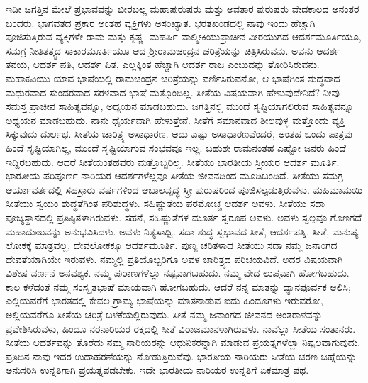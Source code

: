 ಇಡೀ ಜಗತ್ತಿನ ಮೇಲೆ ಪ್ರಭಾವವನ್ನು ಬೀರಬಲ್ಲ ಮಹಾಪುರುಷರು ಮತ್ತು ಅವತಾರ ಪುರುಷರು ವೇದಕಾಲದ ಅನಂತರ ಬಂದರು. ಭಾಗವತದ ಪ್ರಕಾರ ಅಂತಹ ವ್ಯಕ್ತಿಗಳು ಅಸಂಖ್ಯಾತ. ಭರತಖಂಡದಲ್ಲಿ ನಾವು ಇಂದು ಹೆಚ್ಚಾಗಿ ಪೂಜಿಸುತ್ತಿರುವ ವ್ಯಕ್ತಿಗಳೇ ರಾಮ ಮತ್ತು ಕೃಷ್ಣ. ಮಹರ್ಷಿ ವಾಲ್ಮೀಕಿಯುಪ್ರಾಚೀನ ವೀರಯುಗದ ಆದರ್ಶಮೂರ್ತಿಯೂ, ಸಮಗ್ರ ನೀತಿತತ್ತ್ವದ ಸಾಕಾರಮೂರ್ತಿಯೂ ಆದ ಶ‍್ರೀರಾಮಚಂದ್ರನ ಚರಿತ್ರೆಯನ್ನು ಚಿತ್ರಿಸಿರುವನು. ಅವನು ಆದರ್ಶ ತನಯ, ಆದರ್ಶ ಪತಿ, ಆದರ್ಶ ಪಿತ, ಎಲ್ಲಕ್ಕಿಂತ ಹೆಚ್ಚಾಗಿ ಆದರ್ಶ ರಾಜ ಎಂಬುದನ್ನು ತೋರಿಸಿರುವನು. ಮಹಾಕವಿಯು ಯಾವ ಭಾಷೆಯಲ್ಲಿ ರಾಮಚಂದ್ರನ ಚರಿತ್ರೆಯನ್ನು ವರ್ಣಿಸಿರುವನೋ, ಆ ಭಾಷೆಗಿಂತ ಶುದ್ಧವಾದ ಮಧುರವಾದ ಸುಂದರವಾದ ಸರಳವಾದ ಭಾಷೆ ಮತ್ತೊಂದಿಲ್ಲ. ಸೀತೆಯ ವಿಷಯವಾಗಿ ಹೇಳುವುದೇನಿದೆ? ನೀವು ಸಮಸ್ತ ಪ್ರಾಚೀನ ಸಾಹಿತ್ಯವನ್ನೂ, ಅಧ್ಯಯನ ಮಾಡಬಹುದು. ಜಗತ್ತಿನಲ್ಲಿ ಮುಂದೆ ಸೃಷ್ಟಿಯಾಗಲಿರುವ ಸಾಹಿತ್ಯವನ್ನೂ ಅಧ್ಯಯನ ಮಾಡಬಹುದು. ನಾನು ಧೈರ್ಯವಾಗಿ ಹೇಳುತ್ತೇನೆ. ಸೀತೆಗೆ ಸಮಾನವಾದ ಶೀಲವುಳ್ಳ ಮತ್ತೊಂದು ವ್ಯಕ್ತಿ ಸಿಕ್ಕುವುದು ದುರ್ಲಭ. ಸೀತೆಯ ಚಾರಿತ್ರ್ಯ ಅಸಾಧಾರಣ. ಅದು ಎಷ್ಟು ಅಸಾಧಾರಣವೆಂದರೆ, ಅಂತಹ ಒಂದು ಪಾತ್ರವು ಹಿಂದೆ ಸೃಷ್ಟಿಯಾಗಿಲ್ಲ, ಮುಂದೆ ಸೃಷ್ಟಿಯಾಗುವ ಸಂಭವವೂ ಇಲ್ಲ. ಬಹುಶಃ ರಾಮನಂತಹ ಎಷ್ಟೋ ಜನರು ಹಿಂದೆ ಇದ್ದಿರಬಹುದು. ಆದರೆ ಸೀತೆಯಂತಹವರು ಮತ್ತೊಬ್ಬರಿಲ್ಲ. ಸೀತೆಯು ಭಾರತೀಯ ಸ್ತ್ರೀಯರ ಆದರ್ಶ ಮೂರ್ತಿ. ಭಾರತೀಯ ಪರಿಪೂರ್ಣ ನಾರಿಯರ ಆದರ್ಶಗಳೆಲ್ಲವೂ ಸೀತೆಯ ಜೀವನದಿಂದ ಮೂಡಿಬಂದಿದೆ. ಸೀತೆಯು ಸಮಗ್ರ ಆರ್ಯಾವರ್ತದಲ್ಲಿ ಸಹಸ್ರಾರು ವರ್ಷಗಳಿಂದ ಆಬಾಲವೃದ್ಧ ಸ್ತ್ರೀ ಪುರುಷರಿಂದ ಪೂಜಿಸಲ್ಪಡುತ್ತಿರುವಳು. ಮಹಿಮಾಮಯಿ ಸೀತೆಯು ಸ್ವಯಂ ಶುದ್ಧತೆಗಿಂತ ಪರಿಶುದ್ಧಳು. ಸಹಿಷ್ಣುತೆಯ ಪರಮೋಚ್ಚ ಆದರ್ಶ ಅವಳು. ಸೀತೆಯು ಸದಾ ಪೂಜ್ಯಸ್ಥಾನದಲ್ಲಿ ಪ್ರತಿಷ್ಠಿತಳಾಗಿರುವಳು. ಸಹನೆ, ಸಹಿಷ್ಣುತೆಗಳ ಮೂರ್ತ ಸ್ವರೂಪ ಅವಳು. ಅವಳು ಸ್ವಲ್ಪವೂ ಗೊಣಗದೆ ಮಹಾದುಃಖವನ್ನು ಅನುಭವಿಸಿದಳು. ಅವಳು ನಿತ್ಯಸಾಧ್ವಿ. ಸದಾ ಶುದ್ಧ ಸ್ವಭಾವದ ಸೀತೆ, ಆದರ್ಶಪತ್ನಿ. ಸೀತೆ, ಮನುಷ್ಯ ಲೋಕಕ್ಕೆ ಮಾತ್ರವಲ್ಲ, ದೇವಲೋಕಕ್ಕೂ ಆದರ್ಶಮೂರ್ತಿ. ಪುಣ್ಯ ಚರಿತಳಾದ ಸೀತೆಯು ಸದಾ ನಮ್ಮ ಜನಾಂಗದ ದೇವತೆಯಾಗಿಯೇ ಇರುವಳು. ನಮ್ಮಲ್ಲಿ ಪ್ರತಿಯೊಬ್ಬರಿಗೂ ಅವಳ ಚಾರಿತ್ರ್ಯದ ಪರಿಚಯವಿದೆ. ಅದರ ವಿಷಯವಾಗಿ ವಿಶೇಷ ವರ್ಣನೆ ಅನವಶ್ಯಕ. ನಮ್ಮ ಪುರಾಣಗಳೆಲ್ಲಾ ನಷ್ಟವಾಗಬಹುದು. ನಮ್ಮ ವೇದ ಲುಪ್ತವಾಗಿ ಹೋಗಬಹುದು. ಕಾಲ ಕಳೆದಂತೆ ನಮ್ಮ ಸಂಸ್ಕೃತಭಾಷೆ ಮಾಯವಾಗಿ ಹೋಗಬಹುದು. ಆದರೆ ನನ್ನ ಮಾತನ್ನು ಧ್ಯಾನಪೂರ್ವಕ ಆಲಿಸಿ; ಎಲ್ಲಿಯವರೆಗೆ ಭಾರತದಲ್ಲಿ ಕೇವಲ ಗ್ರಾಮ್ಯ ಭಾಷೆಯನ್ನು ಮಾತನಾಡುವ ಐದು ಹಿಂದೂಗಳು ಇರುವರೋ, ಅಲ್ಲಿಯವರೆಗೂ ಸೀತೆಯ ಚರಿತ್ರೆ ಬಳಕೆಯಲ್ಲಿರುವುದು. ಸೀತೆ ನಮ್ಮ ಜನಾಂಗದ ಜೀವನದ ಅಂತರಾಳವನ್ನು ಪ್ರವೇಶಿಸಿರುವಳು, ಹಿಂದೂ ನರನಾರಿಯರ ರಕ್ತದಲ್ಲಿ ಸೀತೆ ವಿರಾಜಮಾನಳಾಗಿರುವಳು. ನಾವೆಲ್ಲಾ ಸೀತೆಯ ಸಂತಾನರು. ಸೀತೆಯ ಆದರ್ಶವನ್ನು ತೊರೆದು ನಮ್ಮ ನಾರಿಯರನ್ನು ಆಧುನಿಕರನ್ನಾಗಿ ಮಾಡುವ ಪ್ರಯತ್ನಗಳೆಲ್ಲಾ ನಿಷ್ಫಲವಾಗುವುದು. ಪ್ರತಿದಿನ ನಾವು ಇದರ ಉದಾಹರಣೆಯನ್ನು ನೋಡುತ್ತಿರುವೆವು. ಭಾರತೀಯ ನಾರಿಯರು ಸೀತೆಯ ಚರಣ ಚಿಹ್ನೆಯನ್ನು ಅನುಸರಿಸಿ ಉನ್ನತಿಗಾಗಿ ಪ್ರಯತ್ನಪಡಬೇಕು. ಇದೇ ಭಾರತೀಯ ನಾರಿಯರ ಉನ್ನತಿಗೆ ಏಕಮಾತ್ರ ಪಥ.

